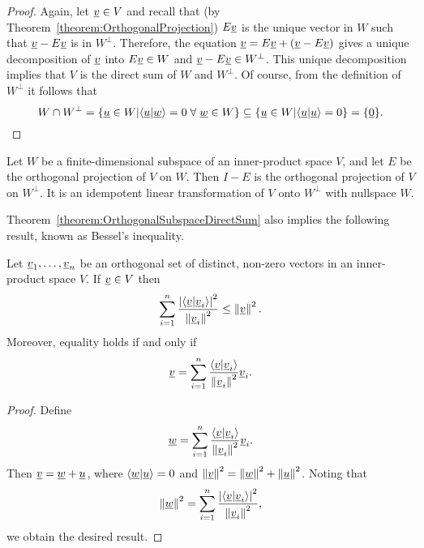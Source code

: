 \begin{proof}
Again, let $\underline{v} \in V$ and recall that (by Theorem~\ref{theorem:OrthogonalProjection}) $E \underline{v}$ is the unique vector in $W$ such that $\underline{v} - E \underline{v}$ is in $W^{\bot}$.
Therefore, the equation $\underline{v} = E \underline{v} + \left( \underline{v} - E \underline{v} \right)$ gives a unique decomposition of $\underline{v}$ into $E \underline{v} \in W$ and $\underline{v} - E \underline{v} \in W^{\bot}$.
This unique decomposition implies that $V$ is the direct sum of $W$ and $W^{\bot}$.
Of course, from the definition of $W^{\bot}$ it follows that
\[W \cap W^{\bot} = \left\{ \underline{u} \in W | \langle \underline{u} | \underline{w} \rangle =0 \; \forall \; \underline{w}\in W \right\}  \subseteq \left\{ \underline{u} \in W | \langle \underline{u} | \underline{u} \rangle =0 \right\}  = \{ \underline{0} \} .\]
\end{proof}

\begin{corollary}
Let $W$ be a finite-dimensional subspace of an inner-product space $V$, and let $E$ be the orthogonal projection of $V$ on $W$.
Then $I - E$ is the orthogonal projection of $V$ on $W^{\bot}$.
It is an idempotent linear transformation of $V$ onto $W^{\bot}$ with nullspace $W$.
\end{corollary}

Theorem~\ref{theorem:OrthogonalSubspaceDirectSum} also implies the following result, known as Bessel's inequality.

\begin{corollary}
Let $\underline{v}_1, \ldots, \underline{v}_n$ be an orthogonal set of distinct, non-zero vectors in an inner-product space $V$.
If $\underline{v} \in V$ then
\begin{equation*}
\sum_{i=1}^n \frac{ \left| \left\langle \underline{v} | \underline{v}_i \right\rangle \right|^2 }{ \left\| \underline{v}_i \right\|^2 }
\leq \left\| \underline{v} \right\|^2.
\end{equation*}
Moreover, equality holds if and only if
\begin{equation*}
\underline{v} = \sum_{i=1}^n \frac{ \left\langle \underline{v} | \underline{v}_i \right\rangle }{ \left\| \underline{v}_i \right\|^2 } \underline{v}_i.
\end{equation*}
\end{corollary}
\begin{proof}
Define
\begin{equation*}
\underline{w} = \sum_{i=1}^n \frac{ \left\langle \underline{v} | \underline{v}_i \right\rangle }{ \left\| \underline{v}_i \right\|^2 } \underline{v}_i.
\end{equation*}
Then $\underline{v} = \underline{w} + \underline{u}$, where $\left\langle \underline{w} | \underline{u} \right\rangle = 0$ and $\left\| \underline{v} \right\|^2 = \left\| \underline{w} \right\|^2 + \left\| \underline{u} \right\|^2$.
Noting that
\begin{equation*}
\left\| \underline{w} \right\|^2
= \sum_{i=1}^n \frac{ \left| \left\langle \underline{v} | \underline{v}_i \right\rangle \right|^2 }{ \left\| \underline{v}_i \right\|^2 },
\end{equation*}
we obtain the desired result.
\end{proof}

